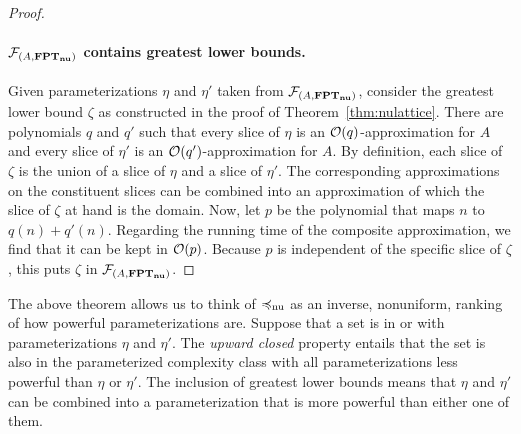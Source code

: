 \begin{proof}
  \paragraph{$\mathcal{F}_{(A, \textnormal{\textbf{FPT$_\textbf{nu}$}})}$ contains greatest lower bounds.}
  Given parameterizations $\eta$ and $\eta'$ taken from $\mathcal{F}_{(A, \textnormal{\textbf{FPT$_\textbf{nu}$}})}$, consider the greatest lower bound $\zeta$ as constructed in the proof of Theorem~\ref{thm:nulattice}.
  There are polynomials $q$ and $q'$ such that every slice of $\eta$ is an $\operatorname{\mathcal{O}}(q)$-approximation for $A$ and every slice of $\eta'$ is an $\operatorname{\mathcal{O}}(q')$-approximation for $A$.
  By definition, each slice of $\zeta$ is the union of a slice of $\eta$ and a slice of $\eta'$.
  The corresponding approximations on the constituent slices can be combined into an approximation of which the slice of $\zeta$ at hand is the domain.
  Now, let $p$ be the polynomial that maps $n$ to $q(n) + q'(n)$.
  Regarding the running time of the composite approximation, we find that it can be kept in $\operatorname{\mathcal{O}}(p)$.
  Because $p$ is independent of the specific slice of $\zeta$, this puts $\zeta$ in $\mathcal{F}_{(A, \textnormal{\textbf{FPT$_\textbf{nu}$}})}$.
\end{proof}

The above theorem allows us to think of $\preccurlyeq_\mathrm{nu}$ as an inverse, nonuniform, ranking of how powerful parameterizations are.
Suppose that a set is in  or  with parameterizations $\eta$ and $\eta'$.
The \emph{upward closed} property entails that the set is also in the parameterized complexity class with all parameterizations less powerful than $\eta$ or $\eta'$.
The inclusion of greatest lower bounds means that $\eta$ and $\eta'$ can be combined into a parameterization that is more powerful than either one of them.


